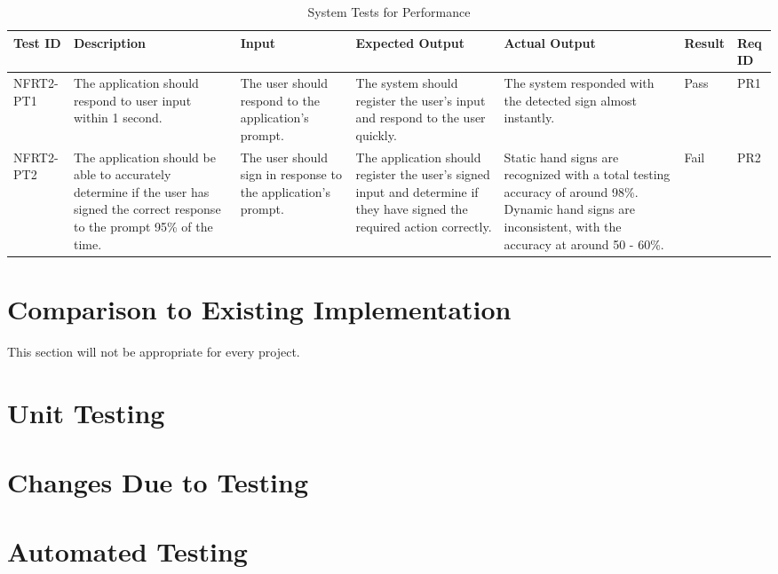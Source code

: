 \documentclass[12pt, titlepage]{article}
\begin{document}
\begin{longtable}{|p{1.5cm}|p{2.5cm}|p{2cm}|p{2cm}|p{2cm}|p{1.5cm}|p{1cm}|}
\caption{System Tests for Performance} \\
\hline
\textbf{Test ID} & \textbf{Description} & \textbf{Input} & \textbf{Expected Output} & \textbf{Actual Output} & \textbf{Result} & \textbf{Req ID}\\
\hline
NFRT2-PT1 & The application should respond to user input within 1 second. & The user should respond to the application's prompt. & The system should register the user's input and respond to the user quickly. & The system responded with the detected sign almost instantly. & Pass & PR1 \\
\hline
NFRT2-PT2 & The application should be able to accurately determine if the user has signed the correct response to the prompt 95\% of the time. & The user should sign in response to the application's prompt. & The application should register the user's signed input and determine if they have signed the required action correctly. & Static hand signs are recognized with a total testing accuracy of around 98\%. Dynamic hand signs are inconsistent, with the accuracy at around 50 - 60\%.  & Fail & PR2 \\
\bottomrule
\end{longtable}
	
\section{Comparison to Existing Implementation}	

This section will not be appropriate for every project.

\section{Unit Testing}

\section{Changes Due to Testing}


\section{Automated Testing}
		
\end{document}
